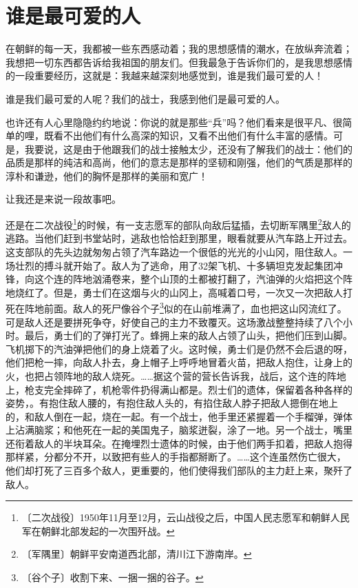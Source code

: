 \documentclass[12pt,UTF-8,openany]{ctexbook}
\begin{document}
\chapter{谁是最可爱的人}

\begin{normalsize}
    
    在朝鲜的每一天，我都被一些东西感动着；我的思想感情的潮水，在放纵奔流着；我想把一切东西都告诉给我祖国的朋友们。但我最急于告诉你们的，是我思想感情的一段重要经历，这就是：我越来越深刻地感觉到，谁是我们最可爱的人！
    
    谁是我们最可爱的人呢？我们的战士，我感到他们是最可爱的人。
    
    也许还有人心里隐隐约约地说：你说的就是那些“兵”吗？他们看来是很平凡、很简单的哩，既看不出他们有什么高深的知识，又看不出他们有什么丰富的感情。可是，我要说，这是由于他跟我们的战士接触太少，还没有了解我们的战士：他们的品质是那样的纯洁和高尚，他们的意志是那样的坚韧和刚强，他们的气质是那样的淳朴和谦逊，他们的胸怀是那样的美丽和宽广！
    
    让我还是来说一段故事吧。
    
    还是在二次战役\footnote{〔二次战役〕1950年11月至12月，云山战役之后，中国人民志愿军和朝鲜人民军在朝鲜北部发起的一次围歼战。}的时候，有一支志愿军的部队向敌后猛插，去切断军隅里\footnote{〔军隅里〕朝鲜平安南道西北部，清川江下游南岸。}敌人的逃路。当他们赶到书堂站时，逃敌也恰恰赶到那里，眼看就要从汽车路上开过去。这支部队的先头边就匆匆占领了汽车路边一个很低的光光的小山冈，阻住敌人。一场壮烈的搏斗就开始了。敌人为了逃命，用了32架飞机、十多辆坦克发起集团冲锋，向这个连的阵地汹涌卷来，整个山顶的土都被打翻了，汽油弹的火焰把这个阵地烧红了。但是，勇士们在这烟与火的山冈上，高喊着口号，一次又一次把敌人打死在阵地前面。敌人的死尸像谷个子\footnote{〔谷个子〕收割下来、一捆一捆的谷子。}似的在山前堆满了，血也把这山冈流红了。可是敌人还是要拼死争夺，好使自己的主力不致覆灭。这场激战整整持续了八个小时。最后，勇士们的了弹打光了。蜂拥上来的敌人占领了山头，把他们压到山脚。飞机掷下的汽油弹把他们的身上烧着了火。这时候，勇士们是仍然不会后退的呀，他们把枪一摔，向敌人扑去，身上帽子上呼呼地冒着火苗，把敌人抱住，让身上的火，也把占领阵地的敌人烧死。……据这个营的营长告诉我，战后，这个连的阵地上，枪支完全摔碎了，机枪零件扔得满山都是。烈士们的遗体，保留着各种各样的姿势，。有抱住敌人腰的，有抱住敌人头的，有掐住敌人脖子把敌人摁倒在地上的，和敌人倒在一起，烧在一起。有一个战士，他手里还紧握着一个手榴弹，弹体上沾满脑浆；和他死在一起的美国鬼子，脑浆迸裂，涂了一地。另一个战士，嘴里还衔着敌人的半块耳朵。在掩埋烈士遗体的时候，由于他们两手扣着，把敌人抱得那样紧，分都分不开，以致把有些人的手指都掰断了。……这个连虽然伤亡很大，他们却打死了三百多个敌人，更重要的，他们使得我们部队的主力赶上来，聚歼了敌人。
    

\end{normalsize}
\end{document}

